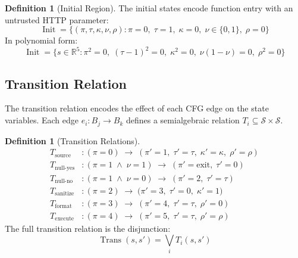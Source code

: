 \documentclass[11pt,a4paper]{article}
\theoremstyle{plain}
\theoremstyle{definition}
\newtheorem{definition}[theorem]{Definition}
\theoremstyle{remark}
\newcommand{\R}{\mathbb{R}}
\newcommand{\StateSpace}{\mathcal{S}}
\newcommand{\Init}{\operatorname{Init}}
\newcommand{\Trans}{\operatorname{Trans}}
\begin{document}
\begin{definition}[Initial Region]
The initial states encode function entry with an untrusted HTTP
parameter:
\begin{equation}
  \Init = \bigl\{(\pi,\tau,\kappa,\nu,\rho) :
    \pi = 0,\;
    \tau = 1,\;
    \kappa = 0,\;
    \nu \in \{0,1\},\;
    \rho = 0
  \bigr\}
\end{equation}
In polynomial form:
\begin{equation}
  \Init = \bigl\{s \in \R^5 :
    \pi^2 = 0,\;
    (\tau - 1)^2 = 0,\;
    \kappa^2 = 0,\;
    \nu(1-\nu) = 0,\;
    \rho^2 = 0
  \bigr\}
\end{equation}
\end{definition}

\subsection{Transition Relation}

The transition relation encodes the effect of each CFG edge on the
state variables.  Each edge $e_i : B_j \to B_k$ defines a
semialgebraic relation $T_i \subseteq \StateSpace \times \StateSpace$.

\begin{definition}[Transition Relations]
\label{def:transitions}
\begin{align}
  T_{\text{source}} &: (\pi=0) \;\longrightarrow\;
    (\pi'=1,\; \tau'=\tau,\; \kappa'=\kappa,\; \rho'=\rho)
    \label{eq:t-source} \\[3pt]
%
  T_{\text{null-yes}} &: (\pi=1 \;\wedge\; \nu=1) \;\longrightarrow\;
    (\pi'=\text{exit},\; \tau'=0)
    \tag{early return} \\[3pt]
%
  T_{\text{null-no}} &: (\pi=1 \;\wedge\; \nu=0) \;\longrightarrow\;
    (\pi'=2,\; \tau'=\tau)
    \label{eq:t-guard} \\[3pt]
%
  T_{\text{sanitize}} &: (\pi=2) \;\longrightarrow\;
    \bigl(\pi'=3,\; \boxed{\tau'=0},\; \kappa'=1\bigr)
    \label{eq:t-sanitize} \\[3pt]
%
  T_{\text{format}} &: (\pi=3) \;\longrightarrow\;
    (\pi'=4,\; \tau'=\tau,\; \rho'=0)
    \label{eq:t-format} \\[3pt]
%
  T_{\text{execute}} &: (\pi=4) \;\longrightarrow\;
    (\pi'=5,\; \tau'=\tau,\; \rho'=\rho)
    \label{eq:t-execute}
\end{align}
The full transition relation is the disjunction:
\begin{equation}
  \Trans(s, s') = \bigvee_i T_i(s, s')
\end{equation}
\end{definition}
\end{document}
